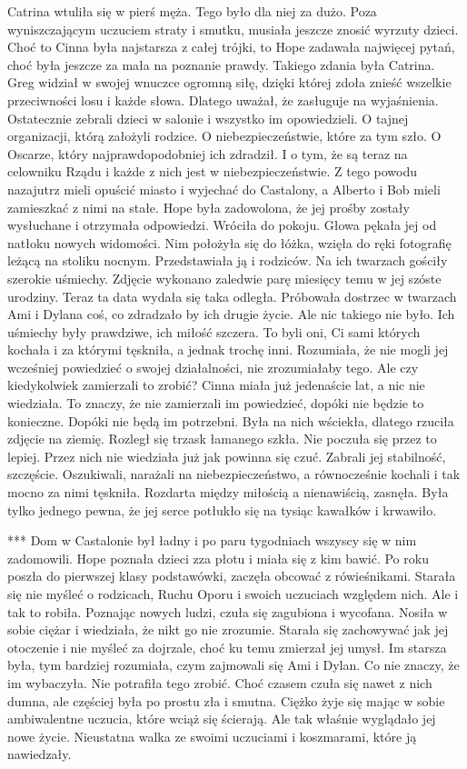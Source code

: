 \documentclass[12pt,a4paper]{book}
\begin{document}
Catrina wtuliła się w pierś męża. Tego było dla niej za dużo. Poza wyniszczającym uczuciem straty i smutku, musiała jeszcze znosić wyrzuty dzieci. Choć to Cinna była najstarsza z całej trójki, to Hope zadawała najwięcej pytań, choć była jeszcze za mała na poznanie prawdy. Takiego zdania była Catrina. Greg widział w swojej wnuczce ogromną siłę, dzięki której zdoła znieść wszelkie przeciwności losu i każde słowa. Dlatego uważał, że zasługuje na wyjaśnienia. Ostatecznie zebrali dzieci w salonie i wszystko im opowiedzieli. O tajnej organizacji, którą założyli rodzice. O niebezpieczeństwie, które za tym szło. O Oscarze, który najprawdopodobniej ich zdradził. I o tym, że są teraz na celowniku Rządu i każde z nich jest w niebezpieczeństwie. Z tego powodu nazajutrz mieli opuścić miasto i wyjechać do Castalony, a Alberto i Bob mieli zamieszkać z nimi na stałe. Hope była zadowolona, że jej prośby zostały wysłuchane i otrzymała odpowiedzi. Wróciła do pokoju. Głowa pękała jej od natłoku nowych widomości. Nim położyła się do łóżka, wzięła do ręki fotografię leżącą na stoliku nocnym. Przedstawiała ją i rodziców. Na ich twarzach gościły szerokie uśmiechy. Zdjęcie wykonano zaledwie parę miesięcy temu w jej szóste urodziny. Teraz ta data wydała się taka odległa. Próbowała dostrzec w twarzach Ami i Dylana coś, co zdradzało by ich drugie życie. Ale nic takiego nie było. Ich uśmiechy były prawdziwe, ich miłość szczera. To byli oni, Ci sami których kochała i za którymi tęskniła, a jednak trochę inni. Rozumiała, że nie mogli jej wcześniej powiedzieć o swojej działalności, nie zrozumiałaby tego. Ale czy kiedykolwiek zamierzali to zrobić? Cinna miała już jedenaście lat, a nic nie wiedziała. To znaczy, że nie zamierzali im powiedzieć, dopóki nie będzie to konieczne. Dopóki nie będą im potrzebni. Była na nich wściekła, dlatego rzuciła zdjęcie na ziemię. Rozległ się trzask łamanego szkła. Nie poczuła się przez to lepiej. Przez nich nie wiedziała już jak powinna się czuć. Zabrali jej stabilność, szczęście. Oszukiwali, narażali na niebezpieczeństwo, a równocześnie kochali i tak mocno za nimi tęskniła. Rozdarta między miłością a nienawiścią,  zasnęła. Była tylko jednego pewna, że jej serce potłukło się na tysiąc kawałków i krwawiło. 

                                        ***
Dom w Castalonie był ładny i po paru tygodniach wszyscy się w nim zadomowili. Hope poznała dzieci zza płotu i miała się z kim bawić. Po roku poszła do pierwszej klasy podstawówki, zaczęła obcować z rówieśnikami. Starała się nie myśleć o rodzicach, Ruchu Oporu i swoich uczuciach względem nich. Ale i tak to robiła. Poznając nowych ludzi, czuła się zagubiona i wycofana. Nosiła w sobie ciężar i wiedziała, że nikt go nie zrozumie. Starała się zachowywać jak jej otoczenie i nie myśleć za dojrzale, choć ku temu zmierzał jej umysł. 
Im starsza była, tym bardziej rozumiała, czym zajmowali się Ami i Dylan. Co nie znaczy, że im wybaczyła. Nie potrafiła tego zrobić. Choć czasem czuła się nawet z nich dumna, ale częściej była po prostu zła i smutna. Ciężko żyje się mając w sobie ambiwalentne uczucia, które wciąż się ścierają. Ale tak właśnie wyglądało jej nowe życie. Nieustatna walka ze swoimi uczuciami i koszmarami, które ją nawiedzały. 
\end{document}
